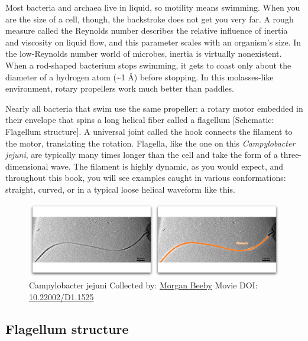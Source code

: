 \documentclass[]{tufte-book}
\begin{document}
Most bacteria and archaea live in liquid, so motility means swimming.
When you are the size of a cell, though, the backstroke does not get you
very far. A rough measure called the Reynolds number describes the
relative influence of inertia and viscosity on liquid flow, and this
parameter scales with an organism's size. In the low-Reynolds number
world of microbes, inertia is virtually nonexistent. When a rod-shaped
bacterium stops swimming, it gets to coast only about the diameter of a
hydrogen atom (\textasciitilde{}1 Å) before stopping. In this
molasses-like environment, rotary propellers work much better than
paddles.

Nearly all bacteria that swim use the same propeller: a rotary motor
embedded in their envelope that spins a long helical fiber called a
flagellum {[}Schematic: Flagellum structure{]}. A universal joint called
the hook connects the filament to the motor, translating the rotation.
Flagella, like the one on this \emph{Campylobacter jejuni}, are
typically many times longer than the cell and take the form of a
three-dimensional wave. The filament is highly dynamic, as you would
expect, and throughout this book, you will see examples caught in
various conformations: straight, curved, or in a typical loose helical
waveform like this.





\begin{figure}
\includegraphics{movie_stills/6_1} \caption[Campylobacter jejuni Collected by:
\protect\hyperlink{morgan_beeby}{Morgan Beeby} Movie DOI:
\href{https://doi.org/10.22002/D1.1525}{10.22002/D1.1525}]{Campylobacter jejuni Collected by:
\protect\hyperlink{morgan_beeby}{Morgan Beeby} Movie DOI:
\href{https://doi.org/10.22002/D1.1525}{10.22002/D1.1525}}\label{fig:6-1}
\end{figure}

\subsection{Flagellum structure}\label{Flagellum_structure}
\end{document}
